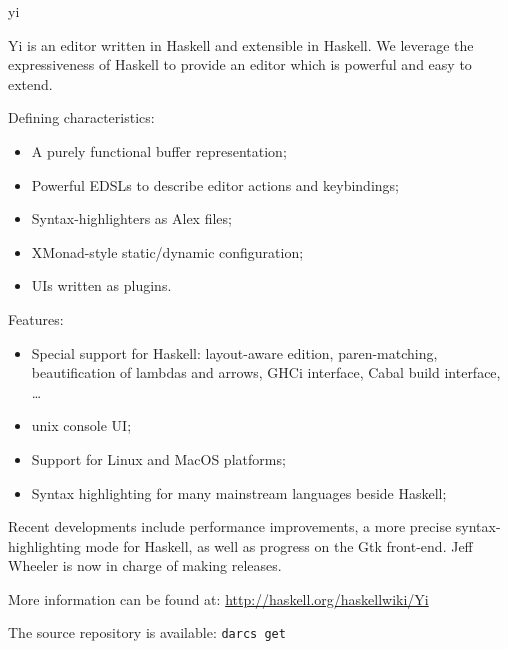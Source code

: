 \begin{hcarentry}[updated]{yi}
\label{yi}
\makeheader

Yi is an editor written in Haskell and extensible in Haskell. We leverage the
expressiveness of Haskell to provide an editor which is powerful and easy to
extend.

Defining characteristics:
\begin{itemize}
\item A purely functional buffer representation;
\item Powerful EDSLs to describe editor actions and keybindings;
\item Syntax-highlighters as Alex files;
\item XMonad-style static/dynamic configuration;
\item UIs written as plugins.
\end{itemize}

Features:
\begin{itemize}
\item Special support for Haskell: layout-aware edition, paren-matching, beautification of lambdas and arrows, GHCi interface, Cabal build interface, \dots
\item unix console UI;
\item Support for Linux and MacOS platforms;
\item Syntax highlighting for many mainstream languages beside Haskell;
\end{itemize}

Recent developments include performance improvements, a more precise
syntax-highlighting mode for Haskell, as well as progress on the Gtk
front-end. Jeff Wheeler is now in charge of making releases.

\FurtherReading
\begin{compactitem}
\item More information can be found at:
 \url{http://haskell.org/haskellwiki/Yi}

\item The source repository is available:
 \texttt{darcs get}
\end{compactitem}
\end{hcarentry}
